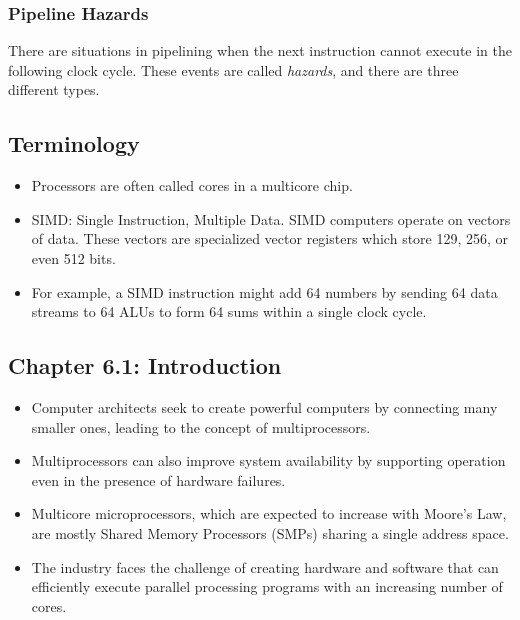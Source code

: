 \documentclass[12pt]{article}
\begin{document}
\subsubsection*{Pipeline Hazards}
There are situations in pipelining when the next instruction cannot execute in the following clock cycle. These events are called \emph{hazards}, and there are three different types.


\subsection*{Terminology}
\begin{itemize}
    \item Processors are often called cores in a multicore chip.
    \item SIMD: Single Instruction, Multiple Data. SIMD computers operate on vectors of data. These vectors are specialized vector registers which store 129, 256, or even 512 bits.
    \item For example, a SIMD instruction might add 64 numbers by sending 64 data streams to 64 ALUs to form 64 sums within a single clock cycle.
\end{itemize}

\subsection*{Chapter 6.1: Introduction}
\begin{itemize}
    \item Computer architects seek to create powerful computers by connecting many smaller ones, leading to the concept of multiprocessors.
    \item Multiprocessors can also improve system availability by supporting operation even in the presence of hardware failures.
    \item Multicore microprocessors, which are expected to increase with Moore's Law, are mostly Shared Memory Processors (SMPs) sharing a single address space.
    \item The industry faces the challenge of creating hardware and software that can efficiently execute parallel processing programs with an increasing number of cores.
\end{itemize}
\end{document}
